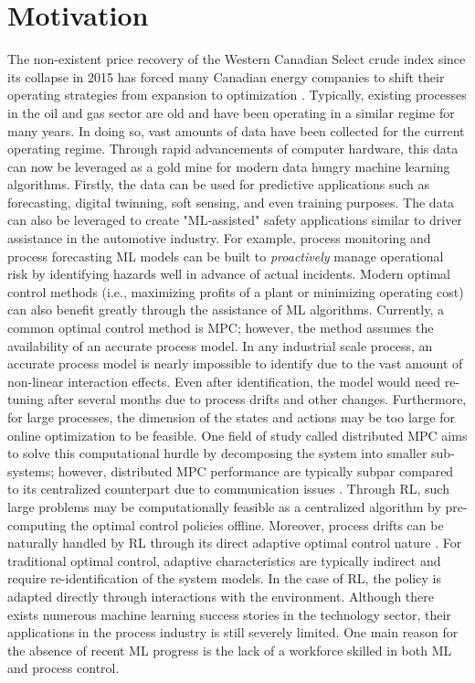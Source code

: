 \section{Motivation}
The non-existent price recovery of the Western Canadian Select crude index since its collapse in 2015 has forced many Canadian energy companies to shift their operating strategies from expansion to optimization \cite{oil_price}.  Typically, existing processes in the oil and gas sector are old and have been operating in a similar regime for many years.  In doing so, vast amounts of data have been collected for the current operating regime.  Through rapid advancements of computer hardware, this data can now be leveraged as a gold mine for modern data hungry machine learning algorithms.  Firstly, the data can be used for predictive applications such as forecasting, digital twinning, soft sensing, and even training purposes.  The data can also be leveraged to create "ML-assisted" safety applications similar to driver assistance in the automotive industry. For example, process monitoring and process forecasting ML models can be built to \textit{proactively} manage operational risk by identifying hazards well in advance of actual incidents. Modern optimal control methods (i.e., maximizing profits of a plant or minimizing operating cost) can also benefit greatly through the assistance of ML algorithms.  Currently, a common optimal control method is MPC; however, the method assumes the availability of an accurate process model.  In any industrial scale process, an accurate process model is nearly impossible to identify due to the vast amount of non-linear interaction effects.  Even after identification, the model would need re-tuning after several months due to process drifts and other changes. Furthermore, for large processes, the dimension of the states and actions may be too large for online optimization to be feasible. One field of study called distributed MPC aims to solve this computational hurdle by decomposing the system into smaller sub-systems; however, distributed MPC performance are typically subpar compared to its centralized counterpart due to communication issues \cite{distributed_mpc}. Through RL, such large problems may be computationally feasible as a centralized algorithm by pre-computing the optimal control policies offline. Moreover, process drifts can be naturally handled by RL through its direct adaptive optimal control nature \cite{direct_adaptive}.  For traditional optimal control, adaptive characteristics are typically indirect and require re-identification of the system models.  In the case of RL, the policy is  adapted directly through interactions with the environment. Although there exists numerous machine learning success stories in the technology sector, their applications in the process industry is still severely limited. One main reason for the absence of recent ML progress is the lack of a workforce skilled in both ML and process control.

